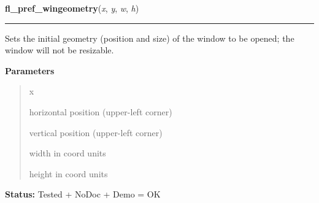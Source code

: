 \hspace{.8\funcindent}\begin{boxedminipage}{\funcwidth}

    \raggedright \textbf{fl\_pref\_wingeometry}(\textit{x}, \textit{y}, \textit{w}, \textit{h})

    \vspace{-1.5ex}

    \rule{\textwidth}{0.5\fboxrule}
\setlength{\parskip}{2ex}
    Sets the initial geometry (position and size) of the window to be 
    opened; the window will not be resizable.

\setlength{\parskip}{1ex}
      \textbf{Parameters}
      \vspace{-1ex}

      \begin{quote}
        \begin{Ventry}{x}

          \item[x]

          horizontal position (upper-left corner)

          \item[y]

          vertical position (upper-left corner)

          \item[w]

          width in coord units

          \item[h]

          height in coord units

        \end{Ventry}

      \end{quote}

\textbf{Status:} Tested + NoDoc + Demo = OK



    \end{boxedminipage}

    \label{xformslib:library:fl_initial_wingeometry}

    \vspace{0.5ex}

